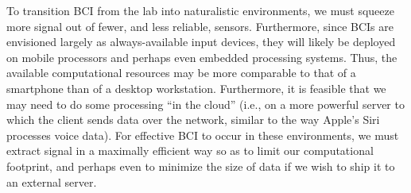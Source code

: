 To transition BCI from the lab into naturalistic environments, we must squeeze more signal out of fewer, and less reliable, sensors. Furthermore, since BCIs are envisioned largely as always-available input devices, they will likely be deployed on mobile processors and perhaps even embedded processing systems. Thus, the available computational resources may be more comparable to that of a smartphone than of a desktop workstation. Furthermore, it is feasible that we may need to do some processing ``in the cloud'' (i.e., on a more powerful server to which the client sends data over the network, similar to the way Apple's Siri processes voice data). For effective BCI to occur in these environments, we must extract signal in a maximally efficient way so as to limit our computational footprint, and perhaps even to minimize the size of data if we wish to ship it to an external server.






